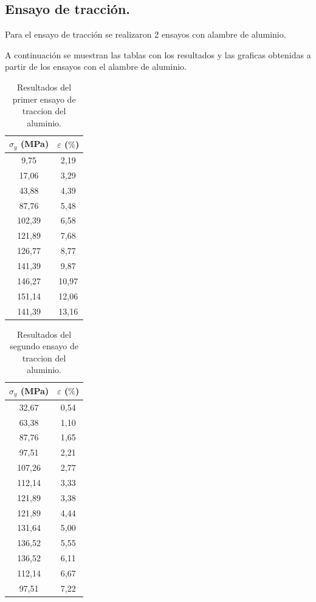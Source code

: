\documentclass[12pt,a4paper]{article}
\begin{document}
\subsection{Ensayo de tracción.}

Para el ensayo de tracción se realizaron 2 ensayos con alambre de aluminio.

A continuación se muestran las tablas con los resultados y las graficas obtenidas a partir de los ensayos con el alambre de aluminio.

\begin{table}[H]
    \centering
    \begin{tabular}{cc}
        \toprule
        \textbf{$\sigma_y$ (MPa)} & \textbf{$\varepsilon$ ($\%$)}\\
        \midrule
        9,75 & 2,19\\
        17,06 & 3,29\\
        43,88 & 4,39\\
        87,76 & 5,48\\
        102,39 & 6,58\\
        121,89 & 7,68\\
        126,77 & 8,77\\
        141,39 & 9,87\\
        146,27 & 10,97\\
        151,14 & 12,06\\
        141,39 & 13,16\\
        \bottomrule
    \end{tabular}
    \caption{Resultados del primer ensayo de traccion del aluminio.}
\end{table}

\begin{table}[H]
    \centering
    \begin{tabular}{cc}
        \toprule
        \textbf{$\sigma_y$ (MPa)} & \textbf{$\varepsilon$ ($\%$)}\\
        \midrule
        32,67 & 0,54\\
        63,38 & 1,10\\
        87,76 & 1,65\\
        97,51 & 2,21\\
        107,26 & 2,77\\
        112,14 & 3,33\\
        121,89 & 3,38\\
        121,89 & 4,44\\
        131,64 & 5,00\\
        136,52 & 5,55\\
        136,52 & 6,11\\
        112,14 & 6,67\\
        97,51 & 7,22\\
        \bottomrule
    \end{tabular}
    \caption{Resultados del segundo ensayo de traccion del aluminio.}
\end{table}
\end{document}
